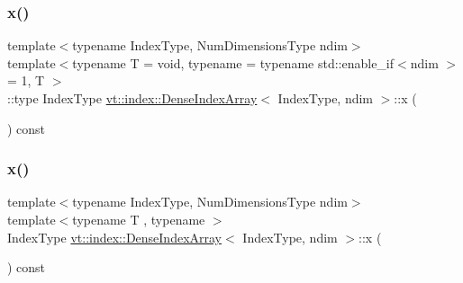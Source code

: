 \mbox{\label{structvt_1_1index_1_1_dense_index_array_a0604b24914af854d09d4da97eae4ef74}} 
\subsubsection{\texorpdfstring{x()}{x()}\hspace{0.1cm}{\footnotesize\ttfamily [1/2]}}
{\footnotesize\ttfamily template$<$typename Index\+Type, Num\+Dimensions\+Type ndim$>$ \\
template$<$typename T  = void, typename  = typename std\+::enable\+\_\+if$<$ndim $>$= 1, T $>$ \\
\+::type Index\+Type \hyperlink{structvt_1_1index_1_1_dense_index_array}{vt\+::index\+::\+Dense\+Index\+Array}$<$ Index\+Type, ndim $>$\+::x (\begin{DoxyParamCaption}{ }\end{DoxyParamCaption}) const}

\mbox{\label{structvt_1_1index_1_1_dense_index_array_af5731c29e392485535d090b57b66a6f5}} 
\subsubsection{\texorpdfstring{x()}{x()}\hspace{0.1cm}{\footnotesize\ttfamily [2/2]}}
{\footnotesize\ttfamily template$<$typename Index\+Type, Num\+Dimensions\+Type ndim$>$ \\
template$<$typename T , typename $>$ \\
Index\+Type \hyperlink{structvt_1_1index_1_1_dense_index_array}{vt\+::index\+::\+Dense\+Index\+Array}$<$ Index\+Type, ndim $>$\+::x (\begin{DoxyParamCaption}{ }\end{DoxyParamCaption}) const}

\mbox{\label{structvt_1_1index_1_1_dense_index_array_a6f150c2dbed44d633b4dc3b62aea2c9b}} 
